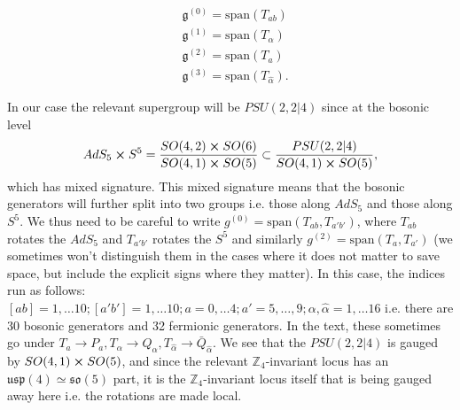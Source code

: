 \documentclass[12pt]{article}
\def\be{\begin{equation}}
\def\ee{\end{equation}}
\numberwithin{equation}{section}
\newcommand{\h}[1]{\hat{#1}}
\begin{document}
\begin{align}
	&\mathfrak{g}^{(0)} = \text{span}(T_{ab}) \\
	&\mathfrak{g}^{(1)} = \text{span}(T_\alpha) \\
	&\mathfrak{g}^{(2)} = \text{span}(T_a) \\
	&\mathfrak{g}^{(3)} = \text{span}(T_{\h{\alpha}}).
\end{align}


In our case the relevant supergroup will be $PSU(2,2|4)$ since at the bosonic level
\be
AdS_5 \cross S^5 = \frac{SO(4,2) \cross SO(6)}{SO(4,1) \cross SO(5)} \subset \frac{PSU(2,2|4)}{SO(4,1)\cross SO(5)},
\ee
which has mixed signature. This mixed signature means that the bosonic generators will further split into two groups i.e. those along $AdS_5$ and those along $S^5$. We thus need to be careful to write $g^{(0)} = \text{span}(T_{ab}, T_{a'b'})$, where $T_{ab}$ rotates the $AdS_5$ and $T_{a'b'}$ rotates the $S^5$ and similarly $g^{(2)} = \text{span}(T_a, T_{a'})$ (we sometimes won't distinguish them in the cases where it does not matter to save space, but include the explicit signs where they matter).  In this case, the indices run as follows: $[ab] = 1, \ldots 10; [a'b'] = 1, \ldots 10; a = 0, \ldots 4; a' = 5, \ldots, 9; \alpha, \h{\alpha} = 1,\ldots 16$ i.e. there are 30 bosonic generators and 32 fermionic generators. In the text, these sometimes go under $T_a \to P_a, T_\alpha \to Q_\alpha, T_{\h{\alpha}} \to \bar{Q}_{\h{\alpha}}$. We see that the $PSU(2,2|4)$ is gauged by $SO(4,1) \cross SO(5)$, and since the relevant $\mathbb{Z}_4$-invariant locus has an $\mathfrak{usp}(4) \simeq \mathfrak{so}(5)$ part, it is the $\mathbb{Z}_4$-invariant locus itself that is being gauged away here i.e. the rotations are made local.
\end{document}
